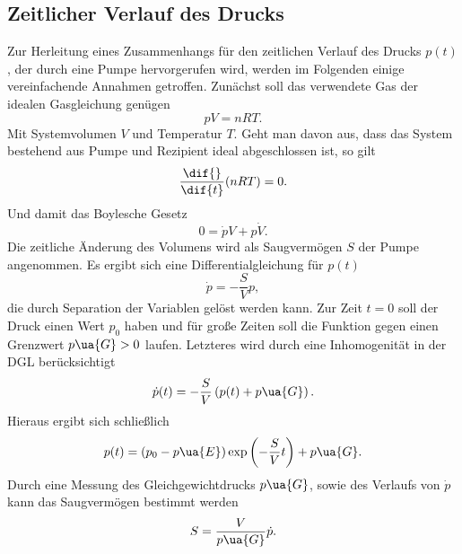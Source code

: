 \subsection{Zeitlicher Verlauf des Drucks}
Zur Herleitung eines Zusammenhangs für den zeitlichen Verlauf des Drucks $p(t)$, der durch eine Pumpe
hervorgerufen wird, werden im Folgenden einige vereinfachende Annahmen getroffen. Zunächst soll das
verwendete Gas der idealen Gasgleichung genügen
\begin{equation}
  p V = n R T.
  \label{eq: ideale_gasgleichung}
\end{equation}
Mit Systemvolumen $V$ und Temperatur $T$. Geht man davon aus, dass das System bestehend aus
Pumpe und Rezipient ideal abgeschlossen ist, so gilt
\begin{equation}
  \frac{\dif{}}{\dif{t}}(n R T ) = 0.
\end{equation}
Und damit das Boylesche Gesetz
\begin{equation}
  0 = \dot{p}V  + p\dot{V}.
\end{equation}
Die zeitliche Änderung des Volumens wird als Saugvermögen $S$ der Pumpe angenommen. Es ergibt sich eine Differentialgleichung für $p(t)$
\begin{equation}
  \dot{p} = - \frac{S}{V} p,
\end{equation}
die durch Separation der Variablen gelöst werden kann. Zur Zeit $t = 0$ soll der Druck einen Wert $p_0$ haben und für große
Zeiten soll die Funktion gegen einen Grenzwert $p\ua{G} > 0$ laufen. Letzteres wird durch eine Inhomogenität in der DGL berücksichtigt
\begin{equation}
  \dot{p}(t) = - \frac{S}{V} \left(p(t) + p\ua{G}\right).
\end{equation}
Hieraus ergibt sich schließlich
\begin{equation}
  p(t) = (p_0 - p\ua{E})\exp\left(- \frac{S}{V} t \right) + p\ua{G}.
  \label{eq: evakuierungskurve}
\end{equation}
Durch eine Messung des Gleichgewichtdrucks $p\ua{G}$, sowie des Verlaufs von $\dot{p}$ kann das Saugvermögen
bestimmt werden
\begin{equation}
  S = \frac{V}{p\ua{G}} \dot{p}.
  \label{eq: saugvermögen_leckrate}
\end{equation}
